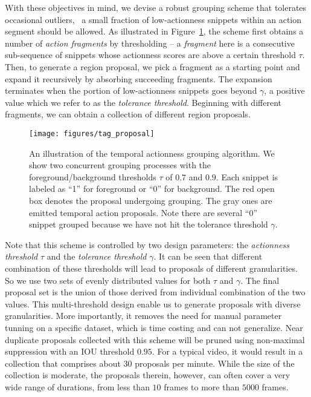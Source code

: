 \documentclass[10pt,twocolumn,letterpaper]{article}
\begin{document}
With these objectives in mind, 
we devise a robust grouping scheme that tolerates occasional outliers,
\eg~a small fraction of low-actionness snippets within an action segment
should be allowed. 
As illustrated in Figure~\ref{fig:tag}, the scheme first obtains a number of 
\emph{action fragments} by thresholding -- a \emph{fragment} here is a
consecutive sub-sequence of snippets whose actionness scores are above
a certain threshold $\tau$. 
Then, to generate a region proposal, we pick a fragment as a starting point
and expand it recursively by absorbing succeeding fragments.
The expansion terminates when the portion of low-actionness snippets goes beyond 
$\gamma$, a positive value which we refer to as the \emph{tolerance threshold}.
Beginning with different fragments, we can obtain a collection of 
different region proposals.

\begin{figure}
\centering
\texttt{[image: figures/tag\_proposal]}
\caption{An illustration of the temporal actionness grouping algorithm.
	We show two concurrent grouping processes with the foreground/background thresholds $ \tau$ of $ 0.7 $ and $ 0.9 $.
	Each snippet is labeled as ``1'' for foreground or ``0'' for background. The red open box denotes the proposal undergoing grouping. The gray ones are emitted temporal action proposals.
	Note there are several ``0'' snippet grouped because we have not hit the tolerance threshold $ \gamma $.}
\label{fig:tag}
\end{figure}



Note that this scheme is controlled by two design parameters:
the \emph{actionness threshold} $\tau$ and the \emph{tolerance threshold} $\gamma$.
It can be seen that different combination of these thresholds will lead to proposals of 
different granularities.
So we use two sets of evenly distributed values for both $\tau$ and $ \gamma $.
The final proposal set is the union of those derived from individual combination of the two values.
This multi-threshold design enable us to generate proposals with diverse granularities.
More importantly, it removes the need for manual parameter tunning on a specific dataset, which is time costing and can not generalize.
Near duplicate proposals collected with this scheme will be pruned using non-maximal suppression 
with an IOU threshold $0.95$.
For a typical video, it would result in a collection that comprises about 
$30$ proposals per minute. 
While the size of the collection is moderate, the proposals therein, however, can often 
cover a very wide range of durations, 
from less than $10 $ frames to more than $ 5000 $ frames. 
\end{document}
